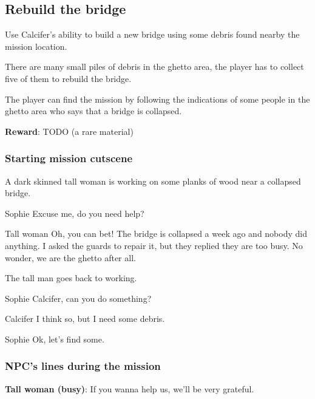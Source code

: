 \subsection{Rebuild the bridge}
Use Calcifer's ability to build a new bridge using some debris found nearby the mission location.

There are many small piles of debris in the ghetto area, the player has to collect five of them to rebuild the bridge.

The player can find the mission by following the indications of some people in the ghetto area who says that a bridge is collapsed.

\textbf{Reward}: TODO (a rare material)

\subsubsection*{Starting mission cutscene}
\begin{screenplay}

A dark skinned tall woman is working on some planks of wood near a collapsed bridge.

\begin{dialogue}{Sophie}
Excuse me, do you need help?
\end{dialogue}

\begin{dialogue}{Tall woman}
Oh, you can bet! The bridge is collapsed a week ago and nobody did anything. I asked the guards to repair it, but they replied they are too busy. No wonder, we are the ghetto after all.
\end{dialogue}

The tall man goes back to working.

\begin{dialogue}{Sophie}
Calcifer, can you do something?
\end{dialogue}

\begin{dialogue}{Calcifer}
I think so, but I need some debris.
\end{dialogue}

\begin{dialogue}{Sophie}
Ok, let's find some.
\end{dialogue}

\end{screenplay}

\subsubsection*{NPC's lines during the mission}
\textbf{Tall woman (busy)}: If you wanna help us, we'll be very grateful.

